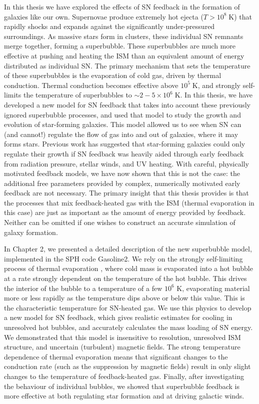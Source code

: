 In this thesis we have explored the effects of SN feedback in the formation of
galaxies like our own.  Supernovae produce extremely hot ejecta
($T>10^8\;\mathrm{K}$) that rapidly shocks and expands against the significantly
under-pressured surroundings.  As massive stars form in clusters, these
individual SN remnants merge together, forming a superbubble.  These
superbubbles are much more effective at pushing and heating the ISM than an
equivalent amount of energy distributed as individual SN.  The primary
mechanism that sets the temperature of these superbubbles is the evaporation of
cold gas, driven by thermal conduction.  Thermal conduction becomes effective
above $10^5\;\mathrm{K}$, and strongly self-limits the temperature of
superbubbles to $\sim2-5\times10^6\;\mathrm{K}$.  In this thesis, we have
developed a new model for SN feedback that takes into account these previously
ignored superbubble processes, and used that model to study the growth and
evolution of star-forming galaxies.  This model allowed us to see when SN can
(and cannot!) regulate the flow of gas into and out of galaxies, where it may
forms stars.  Previous work \citep{Stinson2013,Hopkins2014} has suggested that
star-forming galaxies could only regulate their growth if SN feedback was
heavily aided through early feedback from radiation pressure, stellar winds, and
UV heating.  With careful, physically motivated feedback models, we have now
shown that this is not the case:  the additional free parameters provided by
complex, numerically motivated early feedback are not necessary.  The primary
insight that this thesis provides is that the processes that mix feedback-heated
gas with the ISM (thermal evaporation in this case) are just as important as the
amount of energy provided by feedback.  Neither can be omitted if one wishes to
construct an accurate simulation of galaxy formation.  

In Chapter 2, we presented a detailed description of the new superbubble model,
implemented in the SPH code {\sc Gasoline2}.  We rely on the strongly
self-limiting process of thermal evaporation \citep{Cowie1977}, where cold mass
is evaporated into a hot bubble at a rate strongly dependent on the temperature
of the hot bubble. This drives the interior of the bubble to a temperature of a
few $10^6$ K, evaporating material more or less rapidly as the temperature dips
above or below this value.  This is the characteristic temperature for SN-heated
gas.  We use this physics to develop a new model for SN feedback, which gives
realistic estimates for cooling in unresolved hot bubbles, and accurately
calculates the mass loading of SN energy.  We demonstrated that this model is
insensitive to resolution, unresolved ISM structure, and uncertain (turbulent)
magnetic fields.  The strong temperature dependence of thermal evaporation means
that significant changes to the conduction rate (such as the suppression by
magnetic fields) result in only slight changes to the temperature of
feedback-heated gas.  Finally, after investigating the behaviour of individual
bubbles, we showed that superbubble feedback is more effective at both
regulating star formation and at driving galactic winds.

